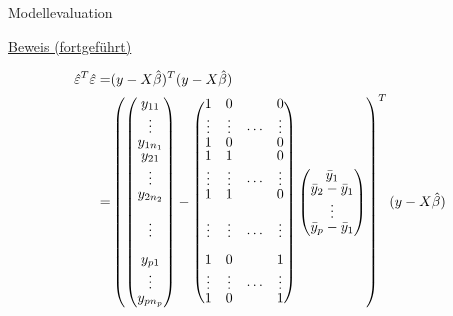 \documentclass[
  8pt,
  ignorenonframetext,
]{beamer}
\begin{document}
\begin{frame}{Modellevaluation}
\protect\hypertarget{modellevaluation-8}{}
\footnotesize

\underline{Beweis (fortgeführt)}

\tiny

\begin{align*}
\renewcommand{\arraystretch}{.8}
\begin{split}
\hat{\varepsilon}^T\hat{\varepsilon}
= & (y - X\hat{\beta})^T(y - X\hat{\beta}) \\
= &
\left(
\begin{pmatrix}
y_{11}          \\
\vdots          \\
y_{1n_1}        \\
y_{21}          \\
\vdots          \\
y_{2n_2}        \\
                \\
\vdots          \\
                \\
y_{p1}          \\
\vdots          \\
y_{pn_p}        \\
\end{pmatrix}
-
\begin{pmatrix}
1       &   0       &           &   0       \\
\vdots  &   \vdots  &   \cdots  &   \vdots  \\
1       &   0       &           &   0       \\
1       &   1       &           &   0       \\
\vdots  &   \vdots  &   \cdots  &   \vdots  \\
1       &   1       &           &   0       \\
        &           &           &           \\
\vdots  &   \vdots  &   \cdots  &   \vdots  \\
        &           &           &           \\
1       &   0       &           &   1       \\
\vdots  &   \vdots  &   \cdots  &   \vdots  \\
1       &   0       &           &   1       \\
\end{pmatrix}
\begin{pmatrix}
\bar{y}_1                               \\
\bar{y}_2 - \bar{y}_1                   \\
\vdots                                  \\
\bar{y}_p - \bar{y}_1                   \\
\end{pmatrix}
\right)^T
(y - X\hat{\beta})
\end{split}
\end{align*}
\end{frame}
\end{document}
